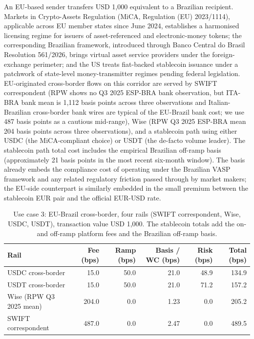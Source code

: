 An EU-based sender transfers USD 1,000 equivalent to a Brazilian recipient. Markets in Crypto-Assets Regulation (MiCA, Regulation (EU) 2023/1114), applicable across EU member states since June 2024, establishes a harmonised licensing regime for issuers of asset-referenced and electronic-money tokens; the corresponding Brazilian framework, introduced through Banco Central do Brasil Resolution 561/2026, brings virtual asset service providers under the foreign-exchange perimeter; and the US treats fiat-backed stablecoin issuance under a patchwork of state-level money-transmitter regimes pending federal legislation. EU-originated cross-border flows on this corridor are served by SWIFT correspondent (RPW shows no Q3 2025 ESP-BRA bank observation, but ITA-BRA bank mean is 1,112 basis points across three observations and Italian-Brazilian cross-border bank wires are typical of the EU-Brazil bank cost; we use 487 basis points as a cautious mid-range), Wise (RPW Q3 2025 ESP-BRA mean 204 basis points across three observations), and a stablecoin path using either USDC (the MiCA-compliant choice) or USDT (the de-facto volume leader). The stablecoin path total cost includes the empirical Brazilian off-ramp basis (approximately 21 basis points in the most recent six-month window). The basis already embeds the compliance cost of operating under the Brazilian VASP framework and any related regulatory friction passed through by market makers; the EU-side counterpart is similarly embedded in the small premium between the stablecoin EUR pair and the official EUR-USD rate.

\begin{table}[H]
\centering
\caption{Use case 3: EU-Brazil cross-border, four rails (SWIFT correspondent, Wise, USDC, USDT), transaction value USD 1,000. The stablecoin totals add the on- and off-ramp platform fees and the Brazilian off-ramp basis.}\label{tab:uc3}
\begin{tabular}{lrrrrr}
\toprule
Rail & Fee (bps) & Ramp (bps) & Basis / WC (bps) & Risk (bps) & Total (bps) \\
\midrule
USDC cross-border               & 15.0  & 50.0 & 21.0 & 48.9 & 134.9 \\
USDT cross-border               & 15.0  & 50.0 & 21.0 & 71.2 & 157.2 \\
Wise (RPW Q3 2025 mean)         & 204.0 & 0.0  & 1.23 & 0.0  & 205.2 \\
SWIFT correspondent             & 487.0 & 0.0  & 2.47 & 0.0  & 489.5 \\
\bottomrule
\end{tabular}
\end{table}

